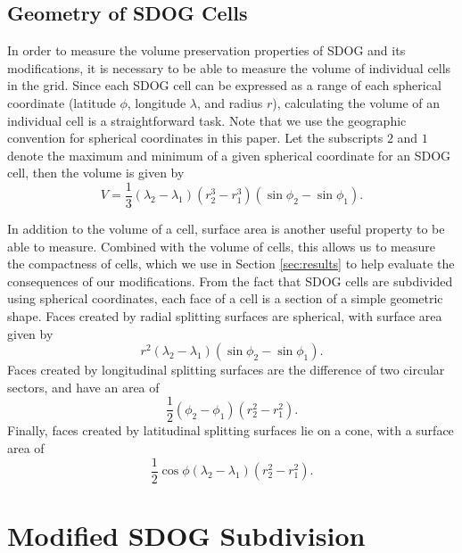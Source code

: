 \subsection{Geometry of SDOG Cells} \label{sec:sdog-geometry}
In order to measure the volume preservation properties of SDOG and its modifications, it is necessary to be able to measure the volume of individual cells in the grid.
Since each SDOG cell can be expressed as a range of each spherical coordinate (latitude $\phi$, longitude $\lambda$, and radius $r$), calculating the volume of an individual cell is a straightforward task.
Note that we use the geographic convention for spherical coordinates in this paper.
Let the subscripts $2$ and $1$ denote the maximum and minimum of a given spherical coordinate for an SDOG cell, then the volume is given by \cite{yu2009sdog}
%
\begin{equation}
V = \frac{1}{3} \left( \lambda_{2} - \lambda_{1} \right) \left(r_{2}^{3} - r_{1}^{3} \right) \left(\sin\phi_{2} - \sin\phi_{1} \right).
\label{eq:volume}
\end{equation}


In addition to the volume of a cell, surface area is another useful property to be able to measure.
Combined with the volume of cells, this allows us to measure the compactness of cells, which we use in Section \ref{sec:results} to help evaluate the consequences of our modifications.
From the fact that SDOG cells are subdivided using spherical coordinates, each face of a cell is a section of a simple geometric shape.
Faces created by radial splitting surfaces are spherical, with surface area given by
%
\begin{equation}
r^{2} \left( \lambda_{2} - \lambda_{1} \right) \left( \sin\phi_{2} - \sin\phi_{1} \right).
\end{equation}
%
Faces created by longitudinal splitting surfaces are the difference of two circular sectors, and have an area of
\begin{equation}
\frac{1}{2} \left( \phi_{2} - \phi_{1} \right) \left( r_{2}^{2} - r_{1}^{2} \right).
\end{equation}
%
Finally, faces created by latitudinal splitting surfaces lie on a cone, with a surface area of
\begin{equation}
\frac{1}{2} \cos\phi \left( \lambda_{2} - \lambda_{1} \right) \left( r_{2}^{2} - r_{1}^{2} \right).
\end{equation}


\section{Modified SDOG Subdivision} \label{sec:method}

